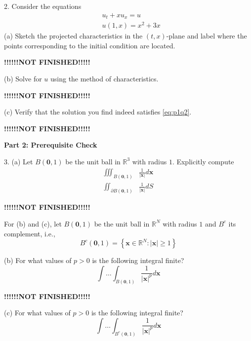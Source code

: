\documentclass{article}
\begin{document}
2. Consider the equations
%
\begin{equation}
    \begin{aligned}
        &u_{t} + x u_{x} = u \\
        &u(1, x) = x^2 + 3 x
    \end{aligned}
    \label{eq:p1q2}
\end{equation}
%
(a) Sketch the projected characteristics in the $(t, x)$-plane and label
where the points corresponding to the initial condition are located.

\quad \textbf{!!!!!!NOT FINISHED!!!!!}

(b) Solve for $u$ using the method of characteristics.

\quad \textbf{!!!!!!NOT FINISHED!!!!!}

(c) Verify that the solution you find indeed satisfies \eqref{eq:p1q2}.

\quad \textbf{!!!!!!NOT FINISHED!!!!!}

\textbf{Part 2: Prerequisite Check}

3. (a) Let $B(\mathbf{0},1)$ be the unit ball in $\mathbb{R}^{3}$ with
   radius $1$. Explicitly compute
%
\begin{align}
    \iiint_{B(\mathbf{0},1)} &\frac{1}{|\mathbf{x}|} d \mathbf{x}
    \label{eq:p2q3a1} \\
    \iint_{\partial B(\mathbf{0},1)} &\frac{1}{|\mathbf{x}|} d S
    \label{eq:p2q3a2}
\end{align}

\quad \textbf{!!!!!!NOT FINISHED!!!!!}

For (b) and (c), let $B(\mathbf{0},1)$ be the unit ball in
$\mathbb{R}^{N}$ with radius $1$ and $B^{c}$ its complement, i.e.,
$$B^{c}(\mathbf{0}, 1) = \left\{\mathbf{x} \in \mathbb{R}^{N}: |\mathbf{x}| \geq 1 \right\}$$

(b) For what values of $p > 0$ is the following integral finite?
\begin{equation}
    \int \ldots \int_{B(\mathbf{0}, 1)} \frac{1}{|\mathbf{x}|^{p}} d \mathbf{x}
    \label{eq:p2q3b}
\end{equation}

\quad \textbf{!!!!!!NOT FINISHED!!!!!}

(c) For what values of $p > 0$ is the following integral finite?
\begin{equation}
    \int \ldots \int_{B^{c}(\mathbf{0}, 1)} \frac{1}{|\mathbf{x}|^{p}} d \mathbf{x}
    \label{eq:p2q3c}
\end{equation}
\end{document}
